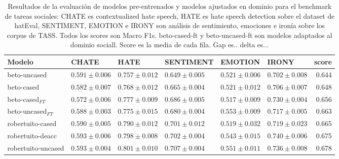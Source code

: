 \begin{table}[ht]
    \centering
    \footnotesize
    \begin{tabular}{llllllr}
        \toprule
        Modelo             & CHATE                   &  HATE              &  SENTIMENT        &  EMOTION          &  IRONY            &     score \\
        \midrule
        beto-uncased       & $0.591 \pm 0.006$ & $0.757 \pm 0.012$ & $0.649 \pm 0.005$ & $0.521 \pm 0.006$& $0.702 \pm 0.008$& 0.644 \\
        beto-cased         & $0.582 \pm 0.007$ & $0.768 \pm 0.012$ & $0.665 \pm 0.004$ & $0.521 \pm 0.012$& $0.706 \pm 0.007$& 0.648 \\
        beto-cased$_{FT}$   & $0.572 \pm 0.006$ & $0.777 \pm 0.009$ & $0.686 \pm 0.005$ & $0.517 \pm 0.009$& $0.730 \pm 0.004$& 0.656 \\
        beto-uncased$_{FT}$ & $0.588 \pm 0.003$ & $0.775 \pm 0.015$ & $0.680 \pm 0.004$ & $0.553 \pm 0.009$& $0.717 \pm 0.005$& 0.663 \\
        \hline
        robertuito-cased   & $0.590 \pm 0.005$ & $0.790 \pm 0.012$ & $0.701 \pm 0.012$ & $0.519 \pm 0.032$& $0.719 \pm 0.023$& 0.665 \\
        robertuito-deacc   & $0.593 \pm 0.006$ & $0.798 \pm 0.008$ & $0.702 \pm 0.004$ & $0.543 \pm 0.015$& $0.740 \pm 0.006$& 0.675 \\
        robertuito-uncased & $0.593 \pm 0.004$ & $0.801 \pm 0.010$ & $0.707 \pm 0.004$ & $0.551 \pm 0.011$& $0.736 \pm 0.008$& 0.678 \\
        \bottomrule
    \end{tabular}
    \caption{Resultados de la evaluación de modelos pre-entrenados y modelos ajustados en dominio para el benchmark de tareas sociales: CHATE es contextualized hate speech, HATE es hate speech detection sobre el dataset de hatEval, SENTIMENT, EMOTION e IRONY son análisis de sentimiento, emociones e ironía sobre los corpus de TASS. Todos los scores son Macro F1s. beto-cased-ft y beto-uncased-ft son modelos adaptados al dominio sociall. Score es la media de cada fila. Gap es.. delta es...}

    \label{tab:domain_adaptation_evaluation_results}

\end{table}


